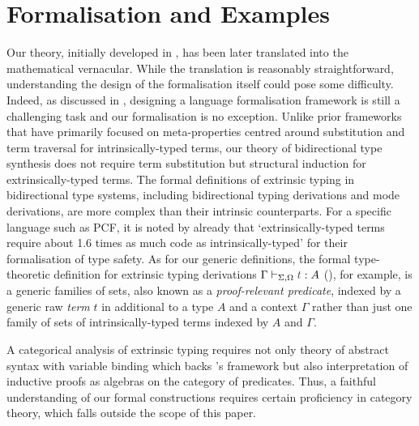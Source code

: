 \documentclass[BiSig.tex]{subfiles}
\begin{document}
\section{Formalisation and Examples} \label{sec:formalisation}
%
Our theory, initially developed in \Agda, has been later translated into the mathematical vernacular.
While the translation is reasonably straightforward, understanding the design of the formalisation itself could pose some difficulty.
Indeed, as discussed in , designing a language formalisation framework is still a challenging task and our formalisation is no exception.
Unlike prior frameworks that have primarily focused on meta-properties centred around substitution and term traversal for intrinsically-typed terms, our theory of bidirectional type synthesis does not require term substitution but structural induction for extrinsically-typed terms.
The formal definitions of extrinsic typing in bidirectional type systems, including bidirectional typing derivations and mode derivations, are more complex than their intrinsic counterparts.
For a specific language such as PCF, it is noted by \citet{Wadler2022} already that `extrinsically-typed terms require about 1.6 times as much code as intrinsically-typed' for their formalisation of type safety.
As for our generic definitions, the formal type-theoretic definition for extrinsic typing derivations $\Gamma \vdash_{\Sigma, \Omega} \isTerm{t} : A$ (), for example, is a generic families of sets, also known as a \emph{proof-relevant predicate}, indexed by a generic raw \emph{term} $t$ in additional to a type $A$ and a context $\Gamma$ rather than just one family of sets of intrinsically-typed terms indexed by $A$ and $\Gamma$.

A categorical analysis of extrinsic typing requires not only  theory of abstract syntax with variable binding which backs \citet{Fiore2022}'s framework but also  interpretation of inductive proofs as algebras on the category of predicates.
Thus, a faithful understanding of our formal constructions requires certain proficiency in category theory, which falls outside the scope of this paper.
\end{document}
